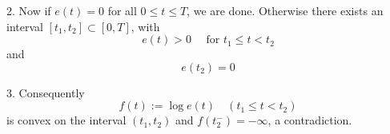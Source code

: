 \begin{theorem}
    2. Now if $e(t)=0$ for all $0 \leq t \leq T$, we are done. Otherwise there exists an interval $\left[t_1, t_2\right] \subset[0, T]$, with
    \begin{equation*}
        e(t)>0 \quad \text { for } t_1 \leq t<t_2
    \end{equation*}
    and
    \begin{equation*}e\left(t_2\right)=0\end{equation*}

    3. Consequently
    \begin{equation*}
        f(t):=\log e(t) \quad\left(t_1 \leq t<t_2\right)
    \end{equation*}
    is convex on the interval $\left(t_1, t_2\right)$ and $f(t_2^-) = -\infty$, a contradiction.
\end{theorem}

